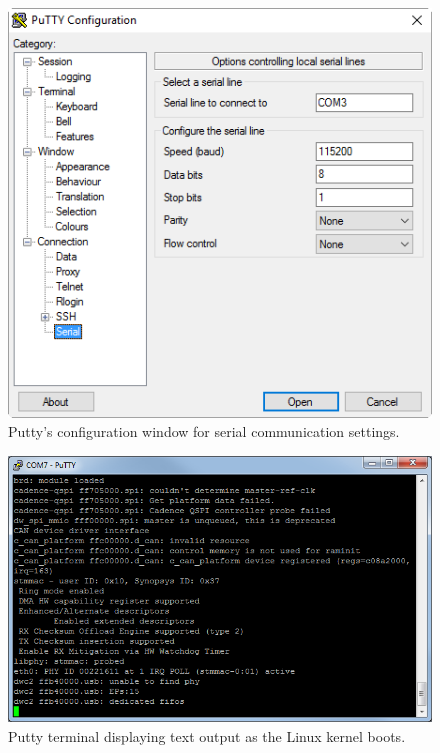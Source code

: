 \documentclass[11pt, twoside, pdftex]{article}
\begin{document}
~\\
\begin{figure}[H]
   \begin{center}
       \includegraphics[scale=0.8]{figures/fig_putty_tut_2}
   \end{center}
   \caption{Putty's configuration window for serial communication settings.}
	\label{fig:putty_2}
\end{figure}

\begin{figure}[H]
   \begin{center}
       \includegraphics[scale=0.7]{figures/fig_putty_tut_3}
   \end{center}
   \caption{Putty terminal displaying text output as the Linux kernel boots.}
	\label{fig:putty_3}
\end{figure}
\end{document}
